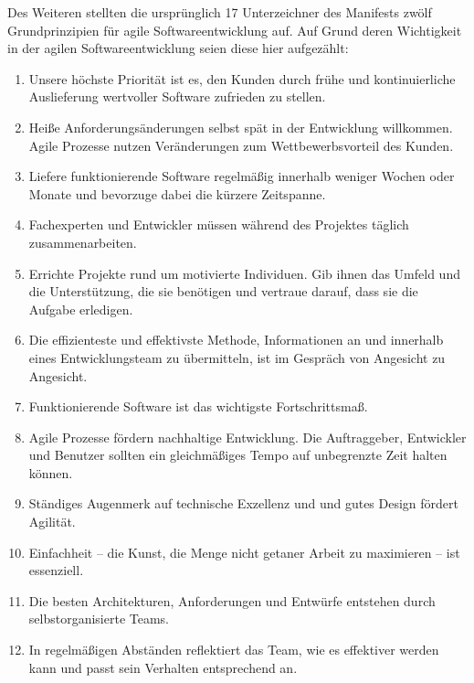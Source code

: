 Des Weiteren stellten die ursprünglich 17 Unterzeichner des Manifests zwölf Grundprinzipien für agile Softwareentwicklung auf. \cite{bib:eckstein} Auf Grund deren Wich\-tig\-keit in der agilen Softwareentwicklung seien diese hier aufgezählt:
\begin{enumerate}
	\item Unsere höchste Priorität ist es, den Kunden durch frühe und kontinuierliche Auslieferung wertvoller Software zufrieden zu stellen.
	\item Heiße Anforderungsänderungen selbst spät in der Entwicklung willkommen. Agile Prozesse nutzen Veränderungen zum Wettbewerbsvorteil des Kunden.
	\item Liefere funktionierende Software regelmäßig innerhalb weniger Wochen oder Monate und bevorzuge dabei die kürzere Zeitspanne.
	\item Fachexperten und Entwickler müssen während des Projektes täglich zusammenarbeiten.
	\item Errichte Projekte rund um motivierte Individuen. Gib ihnen das Umfeld und die Unterstützung, die sie benötigen und vertraue darauf, dass sie die Aufgabe erledigen.
	\item Die effizienteste und effektivste Methode, Informationen an und innerhalb eines Entwicklungsteam zu übermitteln, ist im Gespräch von Angesicht zu Angesicht.
	\item Funktionierende Software ist das wichtigste Fortschrittsmaß.
	\item Agile Prozesse fördern nachhaltige Entwicklung. Die Auftraggeber, Entwickler und Benutzer sollten ein gleichmäßiges Tempo auf unbegrenzte Zeit halten können.
	\item Ständiges Augenmerk auf technische Exzellenz und und gutes Design fördert Agilität.
	\item Einfachheit -- die Kunst, die Menge nicht getaner Arbeit zu maximieren -- ist essenziell.
	\item Die besten Architekturen, Anforderungen und Entwürfe entstehen durch selbstorganisierte Teams.
	\item In regelmäßigen Abständen reflektiert das Team, wie es effektiver werden kann und passt sein Verhalten entsprechend an.
\end{enumerate}
